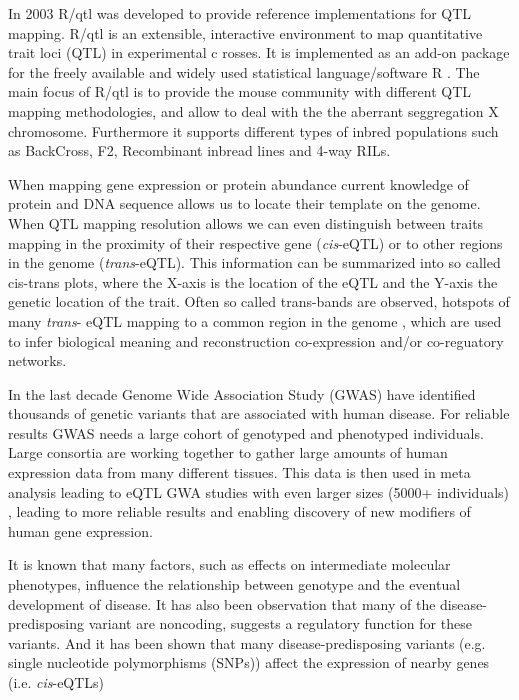 In 2003 R/qtl was developed to provide reference implementations for QTL mapping. R/qtl is 
an extensible, interactive environment to map quantitative trait loci (QTL) in experimental c
rosses. It is implemented as an add-on package for the freely available and widely used 
statistical language/software R \cite{R:2009}. The main focus of R/qtl is to provide 
the mouse community with different QTL mapping methodologies, and allow to deal with the 
the aberrant seggregation X chromosome. Furthermore it supports different types of inbred 
populations such as BackCross, F2, Recombinant inbread lines and 4-way RILs. \cite{Broman:2003}

When mapping gene expression or protein abundance current knowledge of protein and DNA sequence 
allows us to locate their template on the genome. When QTL mapping resolution allows we can even 
distinguish between traits mapping in the proximity of their respective gene (\emph{cis}-eQTL) 
or to other regions in the genome (\emph{trans}-eQTL). This information can be summarized into 
so called cis-trans plots, where the X-axis is the location of the eQTL and the Y-axis the genetic 
location of the trait. Often so called trans-bands are observed, hotspots of many \emph{trans}-
eQTL mapping to a common region in the genome \cite{Breitling:2008a}, which are used to infer 
biological meaning and reconstruction co-expression and/or co-reguatory networks.

In the last decade Genome Wide Association Study (GWAS) have identified thousands of genetic 
variants that are associated with human disease\cite{Hindorff:2009}. For reliable results GWAS 
needs a large cohort of genotyped and phenotyped individuals. Large consortia are working 
together to gather large amounts of human expression data from many different tissues. This 
data is then used in meta analysis leading to eQTL GWA studies with even larger sizes 
(5000+ individuals) \cite{Lude:2011}, leading to more reliable results and enabling discovery 
of new modifiers of human gene expression.

It is known that many factors, such as effects on intermediate molecular phenotypes, influence 
the relationship between genotype and the eventual development of disease. It has also been 
observation that many of the disease-predisposing variant are noncoding, suggests a regulatory 
function for these variants. And it has been shown that many disease-predisposing variants 
(e.g. single nucleotide polymorphisms (SNPs)) affect the expression of nearby genes (i.e. 
\emph{cis}-eQTLs)\cite{Powell:2012, Lude:2011, Zeller:2010}

